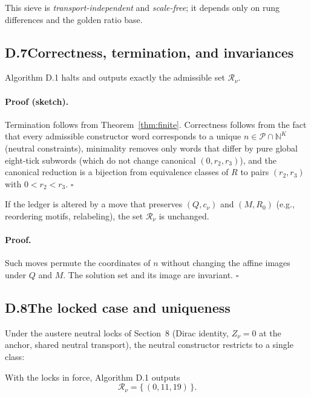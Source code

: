 \documentclass[11pt]{article}
\begin{document}
This sieve is \emph{transport-independent} and \emph{scale-free}; it depends only on rung differences and the golden ratio base.

\subsection*{D.7\quad Correctness, termination, and invariances}

\begin{proposition}
Algorithm D.1 halts and outputs exactly the admissible set $\mathcal{R}_\nu$.
\end{proposition}

\paragraph{Proof (sketch).}
Termination follows from Theorem~\ref{thm:finite}. Correctness follows from the fact that every admissible constructor word corresponds to a unique $n\in\mathcal{P}\cap\mathbb{N}^K$ (neutral constraints), minimality removes only words that differ by pure global eight-tick subwords (which do not change canonical $(0,r_2,r_3)$), and the canonical reduction is a bijection from equivalence classes of $R$ to pairs $(r_2,r_3)$ with $0<r_2<r_3$. \hfill$\square$

\begin{proposition}
If the ledger is altered by a move that preserves $(Q,c_\nu)$ and $(M,R_0)$ (e.g., reordering motifs, relabeling), the set $\mathcal{R}_\nu$ is unchanged.
\end{proposition}

\paragraph{Proof.}
Such moves permute the coordinates of $n$ without changing the affine images under $Q$ and $M$. The solution set and its image are invariant. \hfill$\square$

\subsection*{D.8\quad The locked case and uniqueness}

Under the austere neutral locks of Section~8 (Dirac identity, $Z_\nu=0$ at the anchor, shared neutral transport), the neutral constructor restricts to a single class:

\begin{lemma}\label{lem:D-locked-unique}
With the locks in force, Algorithm D.1 outputs
\[
\mathcal{R}_\nu=\{\, (0,11,19)\,\}.
\]
\end{lemma}
\end{document}
